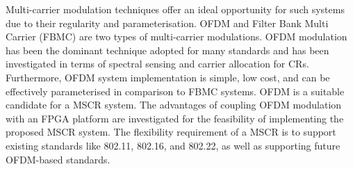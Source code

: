 
Multi-carrier modulation techniques offer an ideal opportunity for such systems due to their regularity and parameterisation. OFDM and Filter Bank Multi Carrier (FBMC) are two types of multi-carrier modulations. OFDM modulation has been the dominant technique adopted for many standards and has been investigated in terms of spectral sensing and carrier allocation for CRs. 
Furthermore, OFDM system implementation is simple, low cost, and can be effectively parameterised in comparison to FBMC systems. OFDM is a suitable candidate for a MSCR system. The advantages of coupling OFDM modulation with an FPGA platform are investigated for the feasibility of implementing the proposed MSCR system. 
The flexibility requirement of a MSCR is to support existing standards like 802.11, 802.16, and 802.22, as well as supporting future OFDM-based standards.


